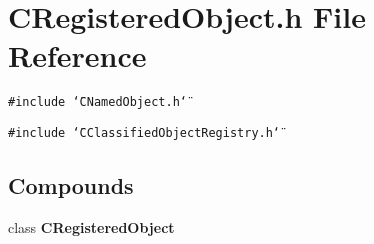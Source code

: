 \section{CRegistered\-Object.h File Reference}
\label{CRegisteredObject_8h}
{\tt \#include \char`\"{}CNamed\-Object.h\char`\"{}}\par
{\tt \#include \char`\"{}CClassified\-Object\-Registry.h\char`\"{}}\par
\subsection*{Compounds}
\begin{CompactItemize}
\item 
class {\bf CRegistered\-Object}
\end{CompactItemize}
